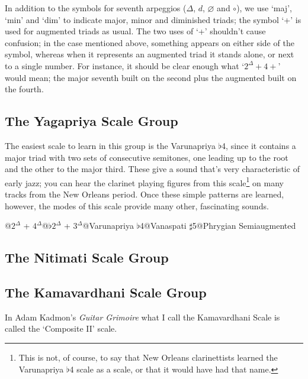 \documentclass[english]{./gbook}
\begin{document}
\begin{large}
In addition to the symbols for seventh arpeggios ($\Delta$, $d$, $\varnothing$ and $\circ$), we use `maj', `min' and `dim' to indicate major, minor and diminished triads; the symbol `+' is used for augmented triads as usual. The two uses of `+' shouldn't cause confusion; in the case mentioned above, something appears on either side of the symbol, whereas when it represents an augmented triad it stands alone, or next to a single number. For instance, it should be clear enough what `$2^{\Delta} + 4+$' would mean; the major seventh built on the second plus the augmented built on the fourth.

\subsection{The Yagapriya Scale Group}

The easiest scale to learn in this group is the Varunapriya $\flat$4, since it contains a major triad with two sets of consecutive semitones, one leading up to the root and the other to the major third. These give a sound that's very characteristic of early jazz; you can hear the clarinet playing figures from this scale\footnote{This is not, of course, to say that New Orleans clarinettists learned the Varunapriya $\flat$4 scale as a scale, or that it would have had that name.} on many tracks from the New Orleans period. Once these simple patterns are learned, however, the modes of this scale provide many other, fascinating sounds.

@$2^{\Delta}$ + $4^{\Delta}$@$\flat 2^{\Delta}$ + $3^{\Delta}$@Varunapriya $\flat$4@Vanaspati $\sharp$5@Phrygian Semiaugmented%

\subsection{The Nitimati Scale Group}

\subsection{The Kamavardhani Scale Group}
In Adam Kadmon's \emph{Guitar Grimoire} what I call the Kamavardhani Scale is called the `Composite II' scale.


\end{large}
\end{document}
